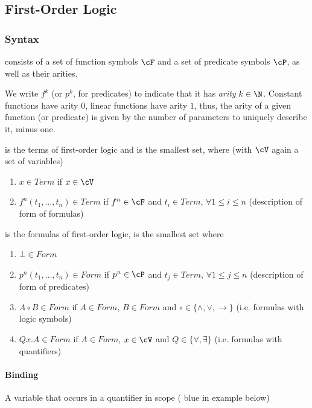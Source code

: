 \newsection
\subsection{First-Order Logic}
\subsubsection{Syntax}
\inlinedefinition[Signature] consists of a set of function symbols $\cF$ and a set of predicate symbols $\cP$, as well as their arities.

We write $f^k$ (or $p^k$, for predicates) to indicate that it has \textit{arity} $k \in \N$.
Constant functions have arity $0$, linear functions have arity $1$, thus, the arity of a given function (or predicate) is given by
the number of parameters to uniquely describe it, minus one.

\inlinedefinition[Term] is the terms of first-order logic and is the smallest set, where (with $\cV$ again a set of variables)
\begin{enumerate}
    \item $x \in \textit{Term}$ if $x \in \cV$
    \item $f^n(t_1, \ldots, t_n) \in \textit{Term}$ if $f^n \in \cF$ and $t_i \in \textit{Term}$, $\forall 1 \leq i \leq n$ (description of form of formulas)
\end{enumerate}

\inlinedefinition[Form] is the formulas of first-order logic, is the smallest set where
\begin{enumerate}
    \item $\bot \in \textit{Form}$
    \item $p^n(t_1, \ldots, t_n) \in \textit{Form}$ if $p^n \in \cP$  and $t_j \in \textit{Term}$, $\forall 1\leq j \leq n$ (description of form of predicates)
    \item $A \circ B \in \textit{Form}$ if $A \in \textit{Form}$, $B \in \textit{Form}$ and $\circ \in \{ \land, \lor, \rightarrow \}$ (i.e. formulas with logic symbols)
    \item $Qx.A \in \textit{Form}$ if $A \in \textit{Form}$, $x \in \cV$ and $Q \in \{ \forall, \exists \}$ (i.e. formulas with quantifiers)
\end{enumerate}


\paragraph{Binding}
 A variable that occurs in a quantifier in scope ({\color{blue} blue in example below})

